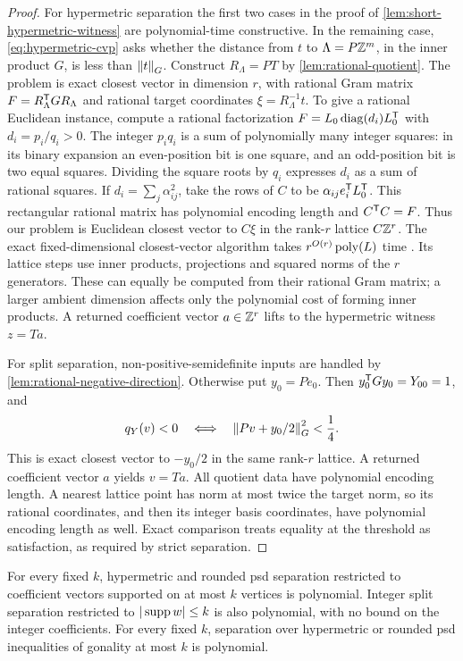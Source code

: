 \begin{proof}
For hypermetric separation the first two cases in the proof of
\cref{lem:short-hypermetric-witness} are polynomial-time constructive.
In the remaining case, \eqref{eq:hypermetric-cvp} asks whether the
distance from $t$ to $\Lambda=P\mathbb Z^m$, in the inner product $G$, is less
than $\left\lVert t\right\rVert_G$. Construct $R_\Lambda=PT$ by
\cref{lem:rational-quotient}. The problem is exact closest vector in
dimension $r$, with rational Gram matrix $F=R_\Lambda^{\mathsf T} G R_\Lambda$ and rational
target coordinates $\xi=R_\Lambda^{-1}t$. To give a rational Euclidean instance,
compute a rational factorization $F=L_0\operatorname{diag}(d_i)L_0^{\mathsf T}$ with
$d_i=p_i/q_i>0$. The integer $p_iq_i$ is a sum of polynomially many
integer squares: in its binary expansion an even-position bit is one
square, and an odd-position bit is two equal squares. Dividing the
square roots by $q_i$ expresses $d_i$ as a sum of rational squares.
If $d_i=\sum_j\alpha_{ij}^2$, take the rows of $C$ to be
$\alpha_{ij}e_i^{\mathsf T} L_0^{\mathsf T}$.  This rectangular rational matrix
has polynomial encoding length and $C^{\mathsf T} C=F$. Thus our problem is
Euclidean closest vector to $C\xi$ in the rank-$r$ lattice $C\mathbb Z^r$.
The exact fixed-dimensional closest-vector algorithm takes
$r^{O(r)}\operatorname{poly}(L)$ time \citep[Theorem~4.5]{Kannan1987}. Its lattice
steps use inner products, projections and squared norms of the $r$
generators. These can equally be computed from their rational Gram
matrix; a larger ambient dimension affects only the polynomial cost of
forming inner products. A returned coefficient
vector $a\in\mathbb Z^r$ lifts to the hypermetric witness $z=Ta$.

For split separation, non-positive-semidefinite inputs are handled by
\cref{lem:rational-negative-direction}. Otherwise put $y_0=Pe_0$.
Then $y_0^{\mathsf T} Gy_0=Y_{00}=1$, and
\[
 q_Y(v)<0
 \quad\Longleftrightarrow\quad
 \left\lVert Pv+y_0/2\right\rVert_G^2<\frac14.
\]
This is exact closest vector to $-y_0/2$ in the same rank-$r$ lattice.
A returned coefficient vector $a$ yields $v=Ta$. All quotient data have
polynomial encoding length. A nearest lattice point has norm at most
twice the target norm, so its rational coordinates, and then its integer
basis coordinates, have polynomial encoding length as well. Exact
comparison treats equality at the threshold as satisfaction, as required
by strict separation.
\end{proof}

\begin{corollary}\label{cor:bounded-support-separation}
For every fixed $k$, hypermetric and rounded psd separation restricted to
coefficient vectors supported on at most $k$ vertices is polynomial. Integer split
separation restricted to $|\operatorname{supp} w|\le k$ is also polynomial, with no
bound on the integer coefficients. For every fixed $k$, separation over
hypermetric or rounded psd inequalities of gonality at most $k$ is
polynomial.
\end{corollary}

